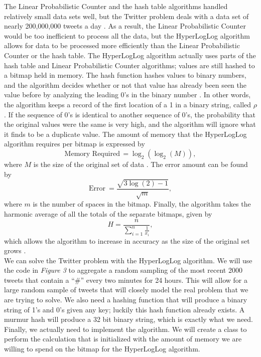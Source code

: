 \documentclass{article}
\begin{document}
\indent The Linear Probabilistic Counter and the hash table algorithms handled relatively small data sets well, but the Twitter problem deals with a data set of nearly 200,000,000 tweets a day \cite{Twitter-2}.
As a result, the Linear Probabilistic Counter would be too inefficient to process all the data, but the HyperLogLog algorithm allows for data to be processed more efficiently than the Linear Probabilistic Counter or the hash table. 
The HyperLogLog algorithm actually uses parts of the hash table and Linear Probabilistic Counter algorithms; values are still hashed to a bitmap held in memory. 
The hash function hashes values to binary numbers, and the algorithm decides whether or not that value has already been seen the value before by analyzing the leading 0's in the binary number \cite[pp. 685, 689]{Heule}.
In other words, the algorithm keeps a record of the first location of a 1 in a binary string, called $\rho$ \cite[pp. 130]{Flaj}.
If the sequence of 0's is identical to another sequence of 0's, the probability that the original values were the same is very high, and the algorithm will ignore what it finds to be a duplicate value. 
The amount of memory that the HyperLogLog algorithm requires per bitmap is expressed by
\[
\text{Memory Required}\, = \log_{2}{\left(\log_{2}{\left(M \right)}\right)},
\]
where $M$ is the size of the original set of data \cite[pp. 129]{Flaj}.
The error amount can be found by
\[
\text{Error}\ = \frac{\sqrt{3\log{(2)} - 1}}{\sqrt{m}},
\]
where $m$ is the number of spaces in the bitmap.
Finally, the algorithm takes the harmonic average of all the totals of the separate bitmaps, given by
\[
H = \frac{n}{\sum_{i=1}^{n}\frac{1}{x_{i}}},
\] 
which allows the algorithm to increase in accuracy as the size of the original set grows \cite{Yousra}.\\
\indent We can solve the Twitter problem with the HyperLogLog algorithm.
We will use the code in \textit{Figure 3} to aggregate a random sampling of the most recent 2000 tweets that contain a ``\#'' every two minutes for 24 hours.
This will allow for a large random sample of tweets that will closely model the real problem that we are trying to solve.
We also need a hashing function that will produce a binary string of 1's and 0's given any key; luckily this hash function already exists.
A murmur hash will produce a 32 bit binary string, which is exactly what we need.
Finally, we actually need to implement the algorithm. 
We will create a class to perform the calculation that is initialized with the amount of memory we are willing to spend on the bitmap for the HyperLogLog algorithm. 
\end{document}
